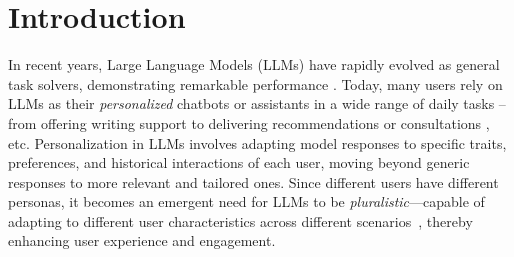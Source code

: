 \section{Introduction}

In recent years, Large Language Models (LLMs) have rapidly evolved as general task solvers, demonstrating remarkable performance \citep{srivastava2023beyond,zhou2023instruction,yue2024mmmu,rein2024gpqa}. 
Today, many users rely on LLMs as their \textit{personalized} chatbots or assistants in a wide range of daily tasks -- from offering writing support \citep{mysore-etal-2024-pearl,tian-etal-2024-large-language} to delivering recommendations \citep{hua2023tutorial} or consultations \citep{xie2024travelplanner, zheng2024natural}, etc. Personalization in LLMs involves adapting model responses to specific traits, preferences, and historical interactions of each user, moving beyond generic responses to more relevant and tailored ones. Since different users have different personas, it becomes an emergent need for LLMs to be \emph{pluralistic}—capable of adapting to different user characteristics across different scenarios~\citep{sorensen2024position, jiang2024peek, xie2024wildfiregpt, kirk2024prism}, thereby enhancing user experience and engagement. 

